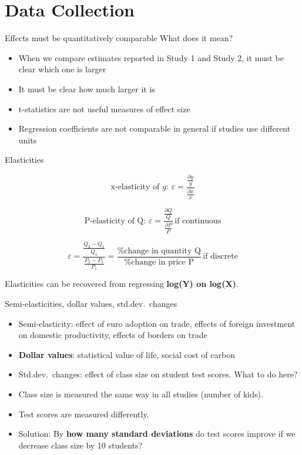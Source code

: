 \documentclass{beamer} %
\begin{document}
\section{Data Collection}


\begin{frame}{Effects must be quantitatively comparable}
What does it mean?

\bigskip

\begin{itemize}
	\item When we compare estimates reported in Study 1 and Study 2, it must be clear which one is larger
	\item It must be clear how much larger it is
	\item t-statistics are not useful measures of effect size
	\item Regression coefficients are not comparable in general if studies use different units
\end{itemize}

\end{frame}



\begin{frame}{Elasticities}

\[
\text{x-elasticity of } y: \, \varepsilon = \frac{\frac{\partial y}{y}}{\frac{\partial x}{x}}
\]

\[
\text{P-elasticity of Q: } \varepsilon = \frac{\frac{\partial Q}{Q}}{\frac{\partial P}{P}} \, \text{if continuous}
\]

\[
\varepsilon = \frac{\frac{Q_2 - Q_1}{Q_1}}{\frac{P_2 - P_1}{P_1}} = \frac{\text{\% change in quantity Q}}{\text{\% change in price P}} \, \text{if discrete}
\]

Elasticities can be recovered from regressing \textbf{log(Y) on log(X)}.


\end{frame}


\begin{frame}{Semi-elasticities, dollar values, std.dev.\ changes}
\begin{itemize}
	\item Semi-elasticity: effect of euro adoption on trade, effects of foreign investment on domestic productivity, effects of borders on trade
	\item \textbf{Dollar values}: statistical value of life, social cost of carbon
	\item Std.dev.\ changes: effect of class size on student test scores. What to do here?
	\item Class size is measured the same way in all studies (number of kids).
	\item Test scores are measured differently.
	\item Solution: By \textbf{how many standard deviations} do test scores improve if we decrease class size by 10 students?
\end{itemize}
\end{frame}
\end{document}
